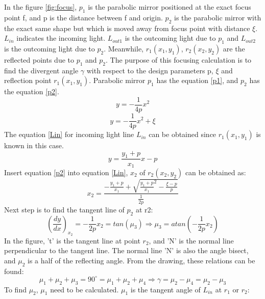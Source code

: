 In the figure \ref{fig:focus}, $p_{1}$ is the parabolic mirror positioned at the exact focus point f, and p is the distance between f and origin. $p_{2}$ is the parabolic mirror with the exact same shape but which is moved away from focus point with distance $\xi$. $L_{in}$ indicates the incoming light. $L_{out1}$ is the outcoming light due to $p_{1}$ and $L_{out2}$ is the outcoming light due to $p_{2}$. Meanwhile, $r_{1}(x_{1}, y_{1})$, $r_{2}(x_{2}, y_{2})$ are the reflected points due to $p_{1}$ and $p_{2}$. The purpose of this focusing calculation is to find the divergent angle $\gamma$ with respect to the design parameters p, $\xi$ and reflection point $r_{1}(x_{1}, y_{1})$. \cite{parabolic_wiki}Parabolic mirror $p_{1}$ has the equation \ref{p1}, and $p_{2}$ has the equation \ref{p2}. 
\begin{equation}
\label{p1}
y = -\frac{1}{4p}x^{2}
\end {equation}
\begin{equation}
\label{p2}
y = -\frac{1}{4p}x^{2}+\xi
\end {equation}
The equation \ref{Lin} for incoming light line $L_{in}$ can be obtained since $r_{1}(x_{1}, y_{1})$ is known in this case. 
\begin{equation}
\label{Lin}
y = \frac{y_{1}+p}{x_{1}}x-p
\end {equation}
Insert equation \ref{p2} into equation \ref{Lin}, $x_{2}$ of $r_{2}(x_{2}, y_{2})$ can be obtained as:
\begin{equation}
\label{x2}
x_{2} = \frac{-\frac{y_{1}+p}{x_{1}}+\sqrt{{\frac{y_{1}+p}{x_{1}}}^2-\frac{\xi-p}{p}}}{\frac{1}{2p}}
\end {equation}
Next step is to find the tangent line of $p_{2}$ at r2:
\begin{equation}
\label{miu3}
(\frac{dy}{dx})_{x_{2}} = -\frac{1}{2p}x_{2} = tan(\mu_{3}) \Rightarrow \mu_{3} = atan(-\frac{1}{2p}x_{2})
\end {equation}
In the figure, 't' is the tangent line at point $r_{2}$, and 'N' is the normal line perpendicular to the tangent line. The normal line 'N' is also the angle bisect, and $\mu_{2}$ is a half of the reflecting angle. From the drawing, these relations can be found:
\begin{equation}
\label{gamma}
\mu_{1}+\mu_{2}+\mu_{3} = 90^{\circ} = \mu_{1}+\mu_{2}+\mu_{4}
\Longrightarrow \gamma = \mu_{2} - \mu_{4} = \mu_{2} - \mu_{3} 
\end {equation}
To find $\mu_{2}$, $\mu_{1}$ need to be calculated. $\mu_{1}$ is the tangent angle of $L_{in}$ at $r_{1}$ or $r_{2}$:
